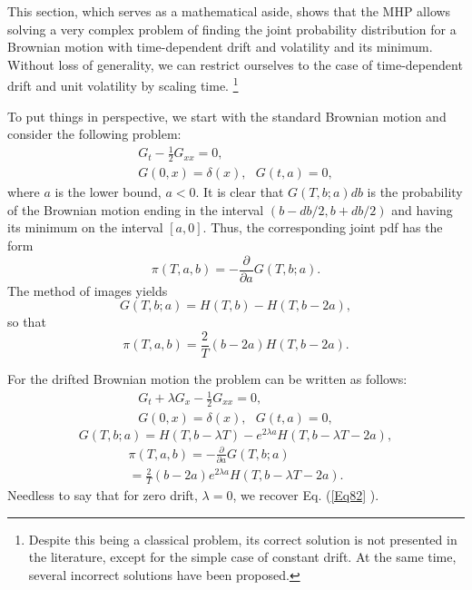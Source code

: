 \documentclass{article}
\begin{document}
This section, which serves as a mathematical aside, shows that the MHP
allows solving a very complex problem of finding the joint probability
distribution for a Brownian motion with time-dependent drift and volatility
and its minimum. Without loss of generality, we can restrict ourselves to
the case of time-dependent drift and unit volatility by scaling time.%
\footnote{%
Despite this being a classical problem, its correct solution is not
presented in the literature, except for the simple case of constant drift.
At the same time, several incorrect solutions have been proposed.}

To put things in perspective, we start with the standard Brownian motion and
consider the following problem:%
\begin{equation}
\begin{array}{c}
G_{t}-\frac{1}{2}G_{xx}=0, \\ 
G\left( 0,x\right) =\delta \left( x\right) ,\ \ \ G(t,a)=0,%
\end{array}
\label{Eq79}
\end{equation}%
where $a$ is the lower bound, $a<0$. It is clear that $G\left( T,b;a\right)
db$ is the probability of the Brownian motion ending in the interval $\left(
b-db/2,b+db/2\right) $ and having its minimum on the interval $\left[ a,0%
\right] $. Thus, the corresponding joint pdf has the form%
\begin{equation}
\pi \left( T,a,b\right) =-\frac{\partial }{\partial a}G\left( T,b;a\right) .
\label{Eq80}
\end{equation}%
The method of images yields%
\begin{equation}
G\left( T,b;a\right) =H\left( T,b\right) -H\left( T,b-2a\right) ,
\label{Eq81}
\end{equation}%
so that%
\begin{equation}
\pi \left( T,a,b\right) =\frac{2}{T}\left( b-2a\right) H\left( T,b-2a\right)
.  \label{Eq82}
\end{equation}

For the drifted Brownian motion the problem can be written as follows:%
\begin{equation}
\begin{array}{c}
G_{t}+\lambda G_{x}-\frac{1}{2}G_{xx}=0, \\ 
G\left( 0,x\right) =\delta \left( x\right) ,\ \ \ G(t,a)=0,%
\end{array}
\label{Eq83}
\end{equation}%
\begin{equation}
G\left( T,b;a\right) =H\left( T,b-\lambda T\right) -e^{2\lambda a}H\left(
T,b-\lambda T-2a\right) ,  \label{Eq84}
\end{equation}%
\begin{equation}
\begin{array}{c}
\pi \left( T,a,b\right) =-\frac{\partial }{\partial a}G\left( T,b;a\right)
\\ 
=\frac{2}{T}\left( b-2a\right) e^{2\lambda a}H\left( T,b-\lambda T-2a\right)
.%
\end{array}
\label{Eq85}
\end{equation}%
Needless to say that for zero drift, $\lambda =0$, we recover Eq. (\ref{Eq82}%
).
\end{document}
